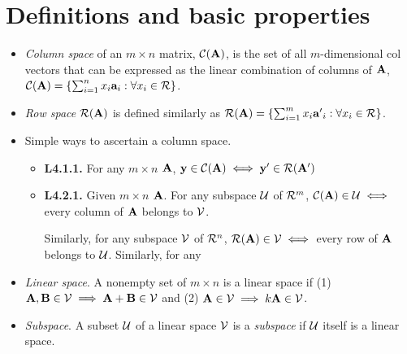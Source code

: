 \documentclass[a4paper, oneside]{book}
\begin{document}
\section{Definitions and basic properties}
\begin{itemize}
\item \textit{Column space} of an $m\times n$ matrix, $\mathcal{C}(\mathbf A) $, is the set of all $m$-dimensional col vectors that can be expressed as the linear combination of columns of $\mathbf A$, \ie $\mathcal{C}(\mathbf A) = \left\{\sum_{i=1}^n x_i\mathbf{a}_i : \forall x_i \in \mathcal{R} \right\}$.
\item \textit{Row space} $\mathcal{R}(\mathbf A) $ is defined similarly as $\mathcal{R}(\mathbf A) = \left\{\sum_{i=1}^m x_i\mathbf{a'}_i : \forall x_i \in \mathcal{R} \right\}$.
\item Simple ways to ascertain a column space.
	\begin{itemize}
	\item \textbf{L4.1.1.} For any $m\times n$ $\mathbf A$, $\mathbf y \in \mathcal C (\mathbf A) \iff \mathbf y' \in \mathcal R(\mathbf A')$
	\item \textbf{L4.2.1.} Given $m\times n$ $\mathbf A$. For any subspace $\mathcal U$ of $\mathcal R^m$, $\mathcal C(\mathbf A) \in \mathcal U \iff $ every column of $\mathbf A$ belongs to $\mathcal V$. 
	
	Similarly, for any subspace $\mathcal V$ of $\mathcal R^n$, $\mathcal R(\mathbf A) \in \mathcal V \iff $ every row of $\mathbf A$ belongs to $\mathcal U$. Similarly, for any
	\end{itemize}
\item \textit{Linear space}. A nonempty set of $m\times n$ is a linear space if (1) $\mathbf{A,B} \in \mathcal{V} \implies \mathbf {A+B} \in \mathcal V$ and (2) $\mathbf A \in \mathcal V \implies k\mathbf A \in \mathcal V$.
\item \textit{Subspace}. A subset $\mathcal U$ of a linear space $\mathcal V$ is a \textit{subspace} if $\mathcal U$ itself is a linear space. 


\end{itemize}
\end{document}
